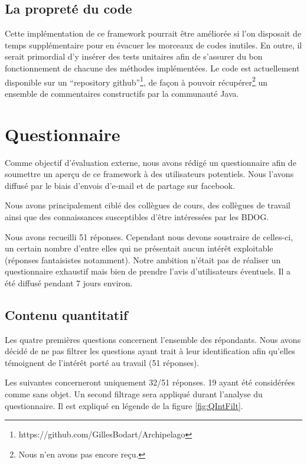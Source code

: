 \documentclass[a4paper,fleqn,12pt,oneside]{report}
\begin{document}
\subsection{La propreté du code}

Cette implémentation de ce framework pourrait être améliorée si l'on disposait de temps supplémentaire pour en évacuer les morceaux de codes inutiles. En outre, il serait primordial d'y insérer des tests unitaires afin de s'assurer du bon fonctionnement de chacune des méthodes implémentées.
\label{propreteDuCode}
Le code est actuellement disponible sur un \enquote{repository github}\footnote{https://github.com/GillesBodart/Archipelago}, de façon à pouvoir récupérer\footnote{Nous n'en avons pas encore reçu.} un ensemble de commentaires constructifs par la communauté Java. 

\section{Questionnaire}

Comme objectif d'évaluation externe, nous avons rédigé un questionnaire afin de soumettre un aperçu de ce framework à des utilisateurs potentiels. Nous l'avons diffusé par le biais d'envois d'e-mail et de partage sur facebook.

Nous avons principalement ciblé des collègues de cours, des collègues de travail ainsi que des connaissances susceptibles d'être intéressées par les BDOG.

Nous avons recueilli 51 réponses. Cependant nous devons soustraire de celles-ci, un certain nombre d'entre elles qui ne présentait aucun intérêt exploitable (réponses fantaisistes notamment). Notre ambition n'était pas de réaliser un questionnaire exhaustif mais bien de prendre l'avis d'utilisateurs éventuels. Il a été diffusé pendant 7 jours environ.


\subsection{Contenu quantitatif}

Les quatre premières questions concernent l'ensemble des répondants. Nous avons décidé de ne pas filtrer les questions ayant trait à leur identification afin qu'elles témoignent de l'intérêt porté au travail (51 réponses).

Les suivantes concerneront uniquement 32/51 réponses. 19 ayant été considérées comme sans objet. Un second filtrage sera appliqué durant l'analyse du questionnaire. Il est expliqué en légende de la figure \ref{fig:QIntFilt}.
\newpage
{}
\end{document}
